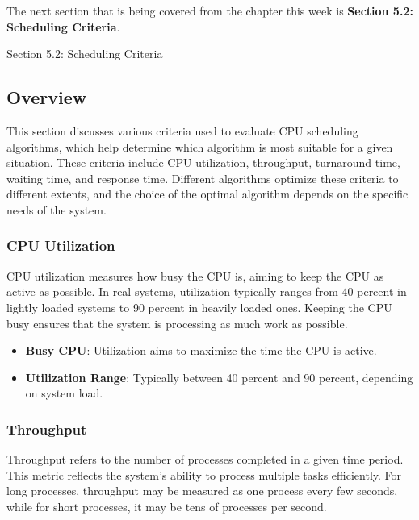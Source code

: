 The next section that is being covered from the chapter this week is \textbf{Section 5.2: Scheduling Criteria}.

\begin{notes}{Section 5.2: Scheduling Criteria}
    \subsection*{Overview}

    This section discusses various criteria used to evaluate CPU scheduling algorithms, which help determine which algorithm is most suitable for a given situation. These criteria include CPU utilization, 
    throughput, turnaround time, waiting time, and response time. Different algorithms optimize these criteria to different extents, and the choice of the optimal algorithm depends on the specific needs 
    of the system.
    
    \subsubsection*{CPU Utilization}
    
    CPU utilization measures how busy the CPU is, aiming to keep the CPU as active as possible. In real systems, utilization typically ranges from 40 percent in lightly loaded systems to 90 percent in heavily 
    loaded ones. Keeping the CPU busy ensures that the system is processing as much work as possible.
    
    \begin{highlight}
    
        \begin{itemize}
            \item \textbf{Busy CPU}: Utilization aims to maximize the time the CPU is active.
            \item \textbf{Utilization Range}: Typically between 40 percent and 90 percent, depending on system load.
        \end{itemize}
    
    \end{highlight}
    
    \subsubsection*{Throughput}
    
    Throughput refers to the number of processes completed in a given time period. This metric reflects the system's ability to process multiple tasks efficiently. For long processes, throughput may be measured 
    as one process every few seconds, while for short processes, it may be tens of processes per second.
    

\end{notes}
